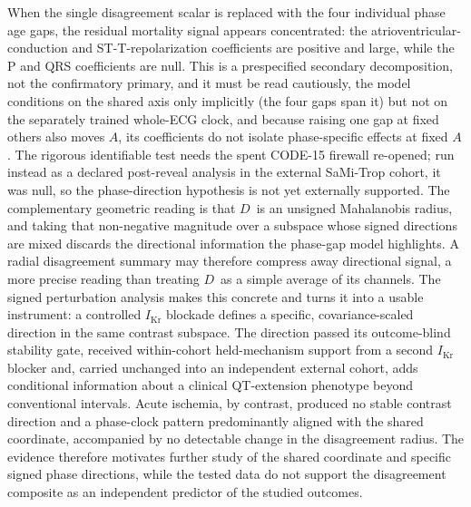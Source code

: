 \documentclass[11pt]{article}
\newcommand{\D}{\ensuremath{D}}
\newcommand{\A}{\ensuremath{A}}
\begin{document}
When the single disagreement
scalar is replaced with the four individual phase age gaps, the residual mortality signal
appears concentrated: the atrioventricular-conduction and ST-T-repolarization coefficients
are positive and large, while the P and QRS coefficients are null. This is a prespecified
secondary decomposition, not the confirmatory primary, and it must be read cautiously, the
model conditions on the shared axis only implicitly (the four gaps span it) but not on the
separately trained whole-ECG clock, and because raising one gap at fixed others also moves
\A, its coefficients do not isolate phase-specific effects at fixed \A. The rigorous
identifiable test needs the spent CODE-15 firewall re-opened; run instead as a declared
post-reveal analysis in the external SaMi-Trop cohort, it was null, so the phase-direction
hypothesis is not yet externally supported. The complementary geometric reading is that
\D\ is an unsigned Mahalanobis radius, and taking that non-negative magnitude over a subspace
whose signed directions are mixed discards the directional information the phase-gap model
highlights. A radial disagreement summary may therefore compress away directional signal, a
more precise reading than treating \D\ as a simple average of its channels. The signed
perturbation analysis makes this concrete and turns it into a usable instrument: a
controlled $I_{\text{Kr}}$ blockade defines a specific, covariance-scaled direction in the
same contrast subspace. The direction passed its outcome-blind stability gate,
received within-cohort held-mechanism support from a second $I_{\text{Kr}}$
blocker and, carried unchanged into an
independent external cohort, adds conditional information about a clinical QT-extension
phenotype beyond conventional intervals.
Acute ischemia, by contrast, produced no stable contrast direction and a
phase-clock pattern predominantly aligned with the shared coordinate, accompanied
by no detectable change in the disagreement radius. The evidence therefore
motivates further study of the shared coordinate and specific signed phase
directions, while the tested data do not support the disagreement composite as
an independent predictor of the studied outcomes.
\end{document}
